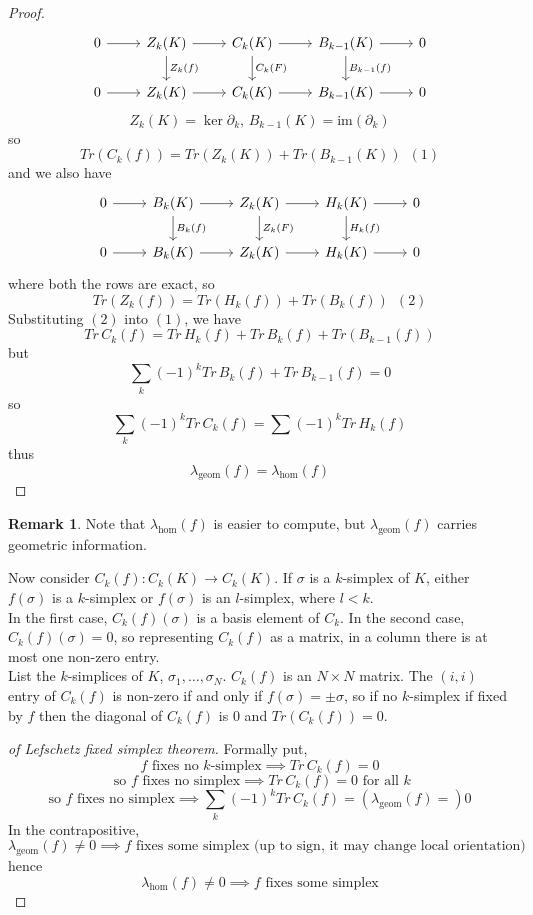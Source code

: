 \documentclass[a4paper,14pt]{extarticle}
\theoremstyle{definition}
\newtheorem*{remark}{Remark}
\begin{document}
\begin{proof}
	\[
	\begin{tikzcd}
		0\arrow{r} & Z_k(K) \arrow{r}
		\arrow{d}{Z_k(f)} & C_k(K) \arrow{r} \arrow{d}{C_k(F)} &
		B_{k-1}(K) \arrow{r}\arrow{d}{B_{k-1}(f)} & 0\\
		0 \arrow{r}& Z_k(K) \arrow{r} & C_k(K) \arrow{r}
		& B_{k-1}(K) \arrow{r} & 0
	\end{tikzcd}
	\]
	\[Z_k(K)=\ker\partial_k,\,B_{k-1}(K)=\text{im}(\partial_k)\]
	so \[Tr(C_k(f)) = Tr(Z_k(K)) + Tr(B_{k-1}(K))\,\,\,(1)\]
	and we also have
	\[
	\begin{tikzcd}
		0\arrow{r} & B_k(K) \arrow{r}
		\arrow{d}{B_k(f)} & Z_k(K) \arrow{r} \arrow{d}{Z_k(F)} &
		H_{k}(K) \arrow{r}\arrow{d}{H_k(f)} & 0\\
		0 \arrow{r}& B_k(K) \arrow{r} & Z_k(K) \arrow{r}
		& H_k(K) \arrow{r} & 0
	\end{tikzcd}
	\]
	where both the rows are exact, so 
	\[Tr(Z_k(f)) = Tr(H_k(f)) + Tr(B_k(f))\,\,\,(2)\]
	Substituting $(2)$ into $(1)$, we have 
	\[Tr \,C_k(f) = Tr \,H_k(f) + Tr \,B_k(f) + Tr (B_{k-1}(f))\] but 
	\[\sum_k (-1)^k Tr \,B_k(f) + Tr \,B_{k-1}(f) = 0\]
	so 
	\[\sum_k (-1)^k Tr \,C_k(f) = \sum (-1)^k Tr \,H_k(f)\] thus 
	\[\lambda_\text{geom}(f)=\lambda_\text{hom}(f)\]
\end{proof}

\begin{remark}
	Note that $\lambda_\text{hom}(f)$ is easier to compute, but $\lambda_\text{geom}(f)$ 
	carries geometric information.
\end{remark}

Now consider $C_k(f):C_k(K)\rightarrow C_k(K)$. If $\sigma$ is a $k$-simplex of $K$, either 
$f(\sigma)$ is a $k$-simplex or $f(\sigma)$ is an $l$-simplex, where $l<k$. \\

In the first case, $C_k(f)(\sigma)$ is a basis element of $C_k$. In the second case, 
$C_k(f)(\sigma)=0$, so representing $C_k(f)$ as a matrix, in a column there is at most 
one non-zero entry. \\

List the $k$-simplices of $K$, $\sigma_1,\ldots,\sigma_N$.
$C_k(f)$ is an $N\times N$ matrix. The $(i,i)$ entry of $C_k(f)$ is non-zero if and 
only if $f(\sigma)=\pm\sigma$, so if no $k$-simplex if fixed by $f$ then the diagonal of 
$C_k(f)$ is $0$ and $Tr(C_k(f))=0$. \\

\begin{proof}[of Lefschetz fixed simplex theorem]
	Formally put, 
\[f\text{ fixes no $k$-simplex}\implies Tr \,C_k(f)=0\]
\[\text{ so $f$ fixes no simplex}\implies Tr \,C_k(f)=0\text{ for all $k$}\]
\[\text{so $f$ fixes no simplex}\implies \sum_k (-1)^k Tr \,C_k(f)=
(\lambda_\text{geom}(f)=)0\]
In the contrapositive,
\[\lambda_\text{geom}(f)\neq0\implies\text{$f$ fixes some simplex (up to sign, it may 
change local orientation)}\] hence 
\[\lambda_\text{hom}(f)\neq0\implies\text{$f$ fixes some simplex}\]
\end{proof}
\end{document}
